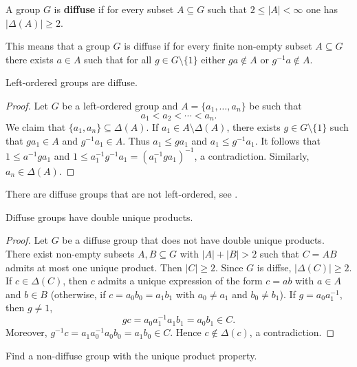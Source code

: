 \begin{definition}
	A group $G$ is \textbf{diffuse} if for every subset $A\subseteq
	G$ such that $2\leq |A|<\infty$ one has $|\Delta(A)|\geq2$.
\end{definition}

This means that a group $G$ is diffuse if for every finite non-empty subset $A\subseteq G$ there exists 
$a\in A$ such that for all $g\in G\setminus\{1\}$ either $ga\not\in A$ or $g^{-1}a\not\in A$. 

\begin{proposition}
	Left-ordered groups are diffuse.	
\end{proposition}

\begin{proof}
    Let $G$ be a left-ordered group and $A=\{a_1,\dots,a_n\}$ be such that
    \[
    a_1<a_2<\cdots<a_n.
    \]
    We claim that 
	$\{a_1,a_n\}\subseteq\Delta(A)$. If $a_1\in
	A\setminus\Delta(A)$, there exists $g\in G\setminus\{1\}$ such that $ga_1\in A$ and
	$g^{-1}a_1\in A$. Thus  $a_1\leq ga_1$ and $a_1\leq g^{-1}a_1$. It follows that
	$1\leq a^{-1}ga_1$ and $1\leq a_1^{-1}g^{-1}a_1=(a_1^{-1}ga_1)^{-1}$, 
	a contradiction. Similarly, $a_n\in \Delta(A)$.
\end{proof}

There are diffuse groups that are not left-ordered, see
\cite{MR3548136}. 

\begin{proposition}
	\label{pro:difuso=>2up}
    Diffuse groups have double unique products.  
\end{proposition}

\begin{proof}
    Let $G$ be a diffuse group that does not have double unique products. 
    There exist non-empty subsets $A,B\subseteq G$ with $|A|+|B|>2$ such that 
	$C=AB$ admits at most one unique product. Then $|C|\geq2$. Since $G$ is diffse, 
	$|\Delta(C)|\geq2$. If $c\in\Delta(C)$, then $c$ admits a unique 
	expression of the form $c=ab$ with $a\in A$ and $b\in B$ (otherwise, if 
	$c=a_0b_0=a_1b_1$ with $a_0\ne a_1$ and $b_0\ne b_1$). If $g=a_0a_1^{-1}$,
	then $g\ne 1$, 
	\[
	gc=a_0a_1^{-1}a_1b_1=a_0b_1\in C.
	\]
	Moreover, 
	$g^{-1}c=a_1a_0^{-1}a_0b_0=a_1b_0\in C$. Hence $c\not\in\Delta(c)$, a contradiction.
\end{proof}

\begin{problem}
	Find a non-diffuse group with the unique product property.
\end{problem}


